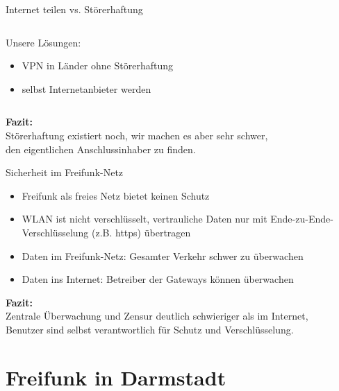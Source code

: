 \documentclass[10pt]{beamer}
\begin{document}
\begin{frame}{Internet teilen vs. Störerhaftung}
\begin{columns}[c]
\begin{column}{8cm}
	\bigskip
	\pause
	
	Unsere Lösungen:
	\begin{itemize}
		\item VPN in Länder ohne Störerhaftung
		\item selbst Internetanbieter werden
	\end{itemize}
		\end{column}
	\end{columns}
	
	\vfill
	\centering
	\pause \textbf{Fazit:}\\Störerhaftung existiert noch, wir machen es aber sehr schwer,\\den eigentlichen Anschlussinhaber zu finden.

\end{frame}

\begin{frame}{Sicherheit im Freifunk-Netz}
	\begin{itemize}[<+->]
		\item Freifunk als freies Netz bietet keinen Schutz
		\item WLAN ist nicht verschlüsselt, vertrauliche Daten nur mit Ende-zu-Ende-Verschlüsselung (z.B. https) übertragen
		\vfill
		\item Daten im Freifunk-Netz: Gesamter Verkehr schwer zu überwachen
		\pause\item Daten ins Internet: Betreiber der Gateways können überwachen
	\end{itemize}
	\vfill
	\pause
	\centering
	\textbf{Fazit:}\\Zentrale Überwachung und Zensur deutlich schwieriger als im Internet, \\
	Benutzer sind selbst verantwortlich für Schutz und Verschlüsselung.
\end{frame}

\section{Freifunk in Darmstadt}
\end{document}
